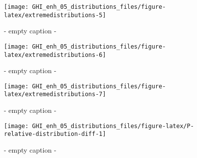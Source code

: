 \documentclass[
  10pt,
  a4paper,oneside]{article}
\begin{document}
\begin{figure}[H]

{\centering \texttt{[image: GHI\_enh\_05\_distributions\_files/figure-latex/extremedistributions-5]} 

}

\caption{ - empty caption - }\label{fig:extremedistributions-5}
\end{figure}
\begin{figure}[H]

{\centering \texttt{[image: GHI\_enh\_05\_distributions\_files/figure-latex/extremedistributions-6]} 

}

\caption{ - empty caption - }\label{fig:extremedistributions-6}
\end{figure}
\begin{figure}[H]

{\centering \texttt{[image: GHI\_enh\_05\_distributions\_files/figure-latex/extremedistributions-7]} 

}

\caption{ - empty caption - }\label{fig:extremedistributions-7}
\end{figure}
\begin{figure}[H]

{\centering \texttt{[image: GHI\_enh\_05\_distributions\_files/figure-latex/P-relative-distribution-diff-1]} 

}

\caption{ - empty caption - }\label{fig:P-relative-distribution-diff-1}
\end{figure}
\end{document}

